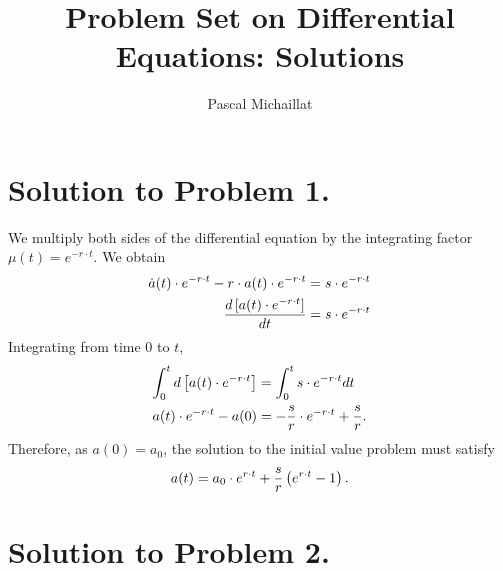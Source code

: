 \documentclass[letterpaper,12pt,leqno]{article}
\begin{document}
\title{Problem Set on Differential Equations: Solutions}
\author{Pascal Michaillat}
\date{}

\begin{titlepage}
\maketitle
\end{titlepage}

\section*{Solution to Problem 1.}

We multiply both sides of the differential equation by the integrating factor $\mu (t)=e^{-r\cdot t}$. We obtain
\begin{align*}
\dot{a}(t)\cdot e^{-r\cdot t}-r\cdot a(t) \cdot e^{-r\cdot t}&=s\cdot e^{-r\cdot t}\\
\frac{d \left[ a(t)\cdot e^{-r\cdot t} \right]}{d t}&=s\cdot e^{-r\cdot t}
\end{align*}
Integrating from time $0$ to $t$, 
\begin{align*}
\int_{0}^{t}d\left[ a(t)\cdot e^{-r\cdot t} \right]&=\int_{0}^{t} s\cdot e^{-r\cdot t} dt\\
a(t)\cdot e^{-r\cdot t}-a(0)&=-\frac{s}{r}\cdot e^{-r\cdot t}+\frac{s}{r}.
\end{align*}
Therefore, as $a(0)=a_{0}$, the solution to the initial value problem must satisfy 
\begin{align*}
a(t)=a_{0}\cdot e^{r\cdot t}+\frac{s}{r}\left( e^{r\cdot t}-1 \right).
\end{align*}

\section*{Solution to Problem 2.}
\end{document}
